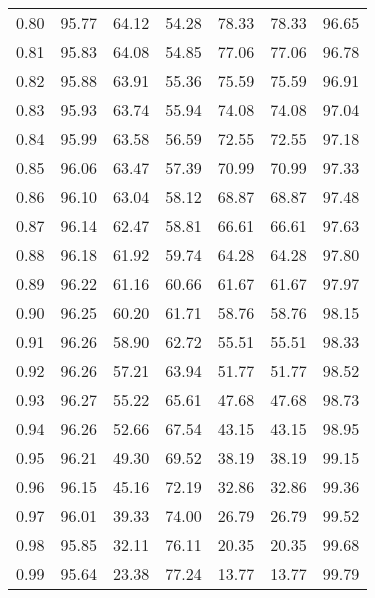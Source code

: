 \begin{tabular}{|c|c|c|c|c|c|c|}
      0.80 &     95.77 &     64.12 &      54.28 &   78.33 &      78.33 &         96.65 \\
      0.81 &     95.83 &     64.08 &      54.85 &   77.06 &      77.06 &         96.78 \\
      0.82 &     95.88 &     63.91 &      55.36 &   75.59 &      75.59 &         96.91 \\
      0.83 &     95.93 &     63.74 &      55.94 &   74.08 &      74.08 &         97.04 \\
      0.84 &     95.99 &     63.58 &      56.59 &   72.55 &      72.55 &         97.18 \\
      0.85 &     96.06 &     63.47 &      57.39 &   70.99 &      70.99 &         97.33 \\
      0.86 &     96.10 &     63.04 &      58.12 &   68.87 &      68.87 &         97.48 \\
      0.87 &     96.14 &     62.47 &      58.81 &   66.61 &      66.61 &         97.63 \\
      0.88 &     96.18 &     61.92 &      59.74 &   64.28 &      64.28 &         97.80 \\
      0.89 &     96.22 &     61.16 &      60.66 &   61.67 &      61.67 &         97.97 \\
      0.90 &     96.25 &     60.20 &      61.71 &   58.76 &      58.76 &         98.15 \\
      0.91 &     96.26 &     58.90 &      62.72 &   55.51 &      55.51 &         98.33 \\
      0.92 &     96.26 &     57.21 &      63.94 &   51.77 &      51.77 &         98.52 \\
      0.93 &     96.27 &     55.22 &      65.61 &   47.68 &      47.68 &         98.73 \\
      0.94 &     96.26 &     52.66 &      67.54 &   43.15 &      43.15 &         98.95 \\
      0.95 &     96.21 &     49.30 &      69.52 &   38.19 &      38.19 &         99.15 \\
      0.96 &     96.15 &     45.16 &      72.19 &   32.86 &      32.86 &         99.36 \\
      0.97 &     96.01 &     39.33 &      74.00 &   26.79 &      26.79 &         99.52 \\
      0.98 &     95.85 &     32.11 &      76.11 &   20.35 &      20.35 &         99.68 \\
      0.99 &     95.64 &     23.38 &      77.24 &   13.77 &      13.77 &         99.79 \\
\bottomrule
\end{tabular}
